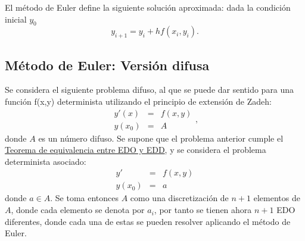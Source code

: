 El método de Euler define la siguiente solución aproximada: dada la condición inicial $y_0$
\[
	y_{i+1} = y_i + h f(x_i, y_i).
\]

\subsection{Método de Euler: Versión difusa}
Se considera el siguiente problema difuso, al que se puede dar sentido para una función f(x,y) determinista utilizando el principio de extensión de Zadeh:
\[
	\begin{array}{ccc}
		y'(x) & = &f(x, y)  \\
		y(x_0) & = & A
	\end{array},
\]
donde $A$ es un número difuso. Se supone que el problema anterior cumple el \hyperref[teorema:equivalencia]{Teorema de equivalencia entre EDO y EDD}, y se considera el problema determinista asociado:
\[
	\begin{array}{ccc}
		y' & = &f(x, y)  \\
		y(x_0) & = & a
	\end{array}
\]
donde $a \in A$. Se toma entonces $A$ como una discretización de $n+1$ elementos de $A$, donde cada elemento se denota por $a_i$, por tanto se tienen ahora $n+1$ EDO diferentes, donde cada una de estas se pueden resolver aplicando el método de Euler.
